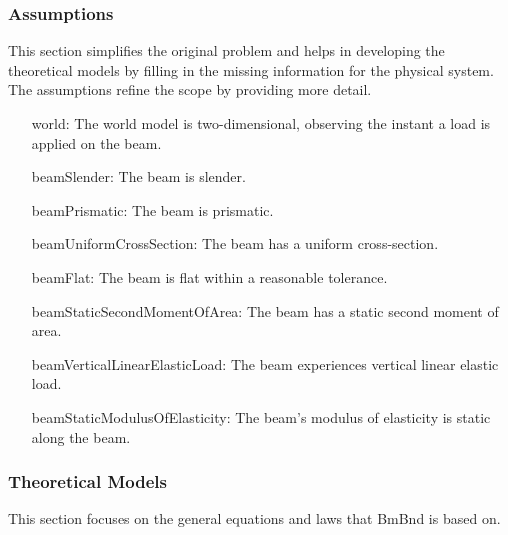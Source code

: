 \documentclass[12pt]{article}
\begin{document}
\subsubsection{Assumptions}
\label{Sec:Assumps}
This section simplifies the original problem and helps in developing the theoretical models by filling in the missing information for the physical system. The assumptions refine the scope by providing more detail.

\begin{itemize}
\item[world:\phantomsection\label{world}]{The world model is two-dimensional, observing the instant a load is applied on the beam.}
\item[beamSlender:\phantomsection\label{beamSlender}]{The beam is slender.}
\item[beamPrismatic:\phantomsection\label{beamPrismatic}]{The beam is prismatic.}
\item[beamUniformCrossSection:\phantomsection\label{beamUniformCrossSection}]{The beam has a uniform cross-section.}
\item[beamFlat:\phantomsection\label{beamFlat}]{The beam is flat within a reasonable tolerance.}
\item[beamStaticSecondMomentOfArea:\phantomsection\label{beamStaticSecondMomentOfArea}]{The beam has a static second moment of area.}
\item[beamVerticalLinearElasticLoad:\phantomsection\label{beamVerticalLinearElasticLoad}]{The beam experiences vertical linear elastic load.}
\item[beamStaticModulusOfElasticity:\phantomsection\label{beamStaticModulusOfElasticity}]{The beam's modulus of elasticity is static along the beam.}
\end{itemize}
\subsubsection{Theoretical Models}
\label{Sec:TMs}
This section focuses on the general equations and laws that BmBnd is based on.
\end{document}
